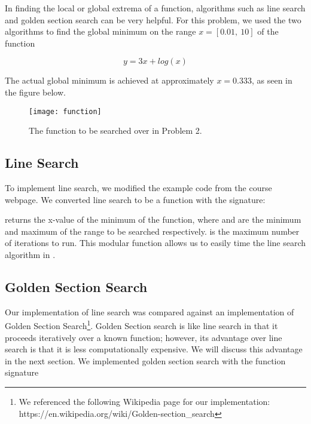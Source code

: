In finding the local or global extrema of a function, algorithms such as line search and golden section search can be very helpful. For this problem, we used the two algorithms to find the global minimum on the range $x = [0.01,\ 10]$ of the function

\begin{equation}
	y = 3x + log(x)
	\label{funtomin}
\end{equation}

The actual global minimum is achieved at approximately $x = 0.333$, as seen in the figure below.

\begin{figure}[H]
\centering\texttt{[image: function]}
\caption{The function to be searched over in Problem 2.}
\end{figure}

\subsection{Line Search}

	To implement line search, we modified the example code from the course webpage. We converted line search to be a function with the signature:

	\begin{center}
	\end{center}
	
	 returns the x-value of the minimum of the function, where  and  are the minimum and maximum of the range to be searched respectively.  is the maximum number of iterations to run. This modular function allows us to easily time the line search algorithm in .

\subsection{Golden Section Search}
	Our implementation of line search was compared against an implementation of Golden Section Search\footnote{We referenced the following Wikipedia page for our implementation: https://en.wikipedia.org/wiki/Golden-section\_search}. Golden Section search is like line search in that it proceeds iteratively over a known function; however, its advantage over line search is that it is less computationally expensive. We will discuss this advantage in the next section. We implemented golden section search with the function signature
	
